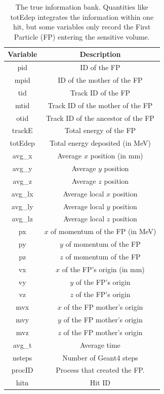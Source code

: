 \begin{table}[h]
	\small
	\begin{center}
		\begin{tabular}{| c | c |}
			\hline \hline
			Variable    & Description  \\
			\hline
				pid         &   ID of the FP                     \\
				mpid        &   ID of the mother of the FP \\
				tid         &   Track ID of the FP\\
				mtid        &   Track ID of the mother of the FP  \\
				otid        &   Track ID of the ancestor of the FP \\
				trackE      &   Total energy of the FP \\
				totEdep     &   Total energy deposited (in MeV) \\
				avg\_x      &   Average $x$ position  (in mm) \\
				avg\_y      &   Average $y$ position  \\
				avg\_z      &   Average $z$ position  \\
				avg\_lx     &   Average local $x$ position \\
				avg\_ly     &   Average local $y$ position \\
				avg\_lz     &   Average local $z$ position \\
				px          &   $x$  of momentum of the FP (in MeV) \\
				py          &   $y$  of momentum of the FP \\
				pz          &   $z$  of momentum of the FP \\
				vx          &   $x$  of the FP's origin (in mm) \\
				vy          &   $y$  of the FP's origin \\
				vz          &   $z$  of the FP's origin \\
				mvx         &   $x$  of the FP mother's origin\\
				mvy         &   $y$  of the FP mother's origin \\
				mvz         &   $z$  of the FP mother's origin \\
				avg\_t      &   Average time \\
				nsteps      &   Number of Geant4 steps \\
				procID      &   Process that created the FP.  \\
				hitn        &   Hit ID \\
			\hline \hline
		\end{tabular}
	\end{center}
	\caption{The true information bank. Quantities like totEdep integrates the information within one hit, but some
             variables only record the First Particle (FP) entering the sensitive volume.}\label{tab:trueInformation}
\end{table}


